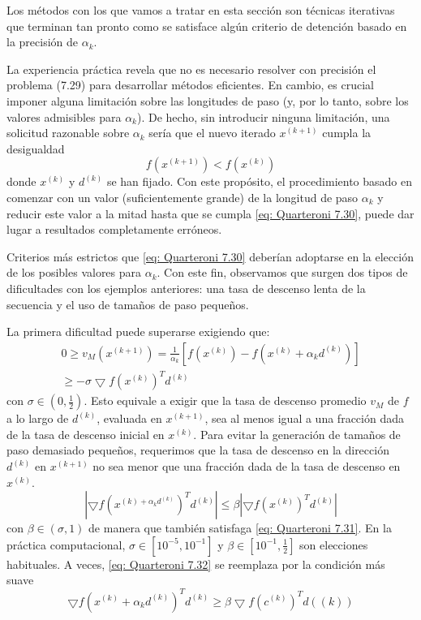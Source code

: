 Los métodos con los que vamos a tratar en esta sección son técnicas iterativas que terminan tan pronto como se satisface algún criterio de detención basado en la precisión de \( \alpha_k \).

La experiencia práctica revela que no es necesario resolver con precisión el problema (7.29) para desarrollar métodos eficientes. En cambio, es crucial imponer alguna limitación sobre las longitudes de paso (y, por lo tanto, sobre los valores admisibles para \( \alpha_k \)). De hecho, sin introducir ninguna limitación, una solicitud razonable sobre \( \alpha_k \) sería que el nuevo iterado \( x^{(k+1)} \) cumpla la desigualdad
\begin{equation}
    \label{eq: Quarteroni 7.30}
    f(x^{(k+1)}) < f(x^{(k)})
\end{equation}
donde \( x^{(k)} \) y \( d^{(k)} \) se han fijado. Con este propósito, el procedimiento basado en comenzar con un valor (suficientemente grande) de la longitud de paso \( \alpha_k \) y reducir este valor a la mitad hasta que se cumpla \ref{eq: Quarteroni 7.30}, puede dar lugar a resultados completamente erróneos.

Criterios más estrictos que \ref{eq: Quarteroni 7.30} deberían adoptarse en la elección de los posibles valores para \( \alpha_k \). Con este fin, observamos que surgen dos tipos de dificultades con los ejemplos anteriores: una tasa de descenso lenta de la secuencia y el uso de tamaños de paso pequeños.

La primera dificultad puede superarse exigiendo que:
\begin{multline}
    \label{eq: Quarteroni 7.31}
    0 \geq v_M (x^{(k + 1)}) = \frac{1}{\alpha_k} \left[ f(x^{(k)}) - f(x^{(k)} + \alpha_k d^{(k)}) \right] \\
    \geq - \sigma \bigtriangledown f(x^{(k)})^T d^{(k)}
\end{multline}
con \( \sigma \in (0, \frac{1}{2}) \). Esto equivale a exigir que la tasa de descenso promedio \( v_M \) de \( f \) a lo largo de \( d^{(k)} \), evaluada en \( x^{(k+1)} \), sea al menos igual a una fracción dada de la tasa de descenso inicial en \( x^{(k)} \). Para evitar la generación de tamaños de paso demasiado pequeños, requerimos que la tasa de descenso en la dirección \( d^{(k)} \) en \( x^{(k+1)} \) no sea menor que una fracción dada de la tasa de descenso en \( x^{(k)} \).  
\begin{equation}
    \label{eq: Quarteroni 7.32}
    \left| \bigtriangledown f(x^{(k) + \alpha_k d^{(k)}})^T d^{(k)} \right| \leq \beta \left| \bigtriangledown f(x^{(k)})^T d^{(k)} \right|
\end{equation}
con \( \beta \in (\sigma, 1) \) de manera que también satisfaga \ref{eq: Quarteroni 7.31}. En la práctica computacional, \( \sigma \in [10^{-5}, 10^{-1}] \) y \( \beta \in [10^{-1}, \frac{1}{2}] \) son elecciones habituales. A veces, \ref{eq: Quarteroni 7.32} se reemplaza por la condición más suave  
\begin{equation}
    \label{eq: Quarteroni 7.33}
    \bigtriangledown f(x^{(k)} + \alpha_k d^{(k)})^T d^{(k)} \geq \beta \bigtriangledown f(c^{(k)})^T d({(k)})
\end{equation}

